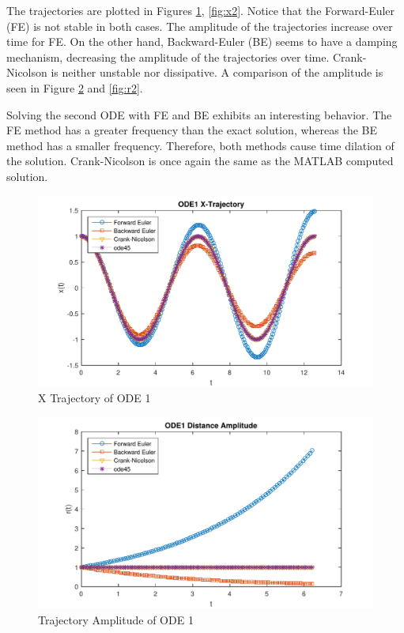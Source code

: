 \documentclass[letterpaper,12pt,]{article}
\begin{document}
The trajectories are plotted in Figures \ref{fig:x1}, \ref{fig:x2}. Notice that the Forward-Euler (FE) is not stable in both cases. The amplitude of the trajectories increase over time for FE. On the other hand, Backward-Euler (BE) seems to have a damping mechanism, decreasing the amplitude of the trajectories over time. Crank-Nicolson is neither unstable nor dissipative. A comparison of the amplitude is seen in Figure \ref{fig:r1} and \ref{fig:r2}.

Solving the second ODE with FE and BE exhibits an interesting behavior. The FE method has a greater frequency than the exact solution, whereas the BE method has a smaller frequency. Therefore, both methods cause time dilation of the solution. Crank-Nicolson is once again the same as the MATLAB computed solution.


\begin{figure}[h]
    \centering
    \includegraphics[height=0.4\textheight]{XTraj1}
    \caption{X Trajectory of ODE 1}
    \label{fig:x1}
\end{figure}

\begin{figure}
    \centering
    \includegraphics[height=0.4\textheight]{R1}
    \caption{Trajectory Amplitude of ODE 1}
    \label{fig:r1}
\end{figure}
\end{document}

